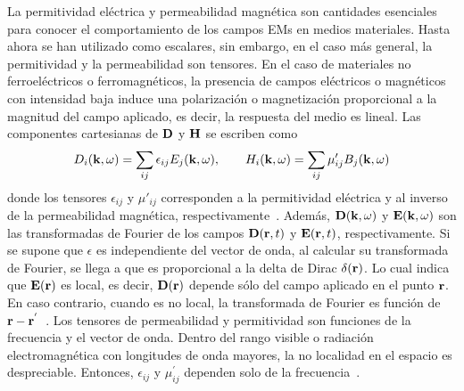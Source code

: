 La permitividad eléctrica y permeabilidad magnética son cantidades esenciales para conocer el comportamiento de los campos EMs en medios materiales. Hasta ahora se han utilizado como escalares, sin embargo, en el caso más general, la permitividad y la permeabilidad son tensores. En el caso de materiales no ferroeléctricos o ferromagnéticos, la presencia de campos eléctricos o magnéticos con intensidad baja induce una polarización o magnetización proporcional a la magnitud del campo aplicado, es decir, la respuesta del medio es lineal. Las componentes cartesianas de $\vb{D}$ y $\vb{H}$ se escriben como~\cite{jackson1999electrodyanmics}
\begin{eqnarray}
D_{i}(\vb{k},\omega)=\sum_{ij}\epsilon_{ij}E_{j}(\vb{k},\omega), \qquad H_{i}(\vb{k},\omega)=\sum_{ij}\mu'_{ij}B_{j}(\vb{k},\omega)\label{eq:def_e_m}
\end{eqnarray}
donde los tensores $\epsilon_{ij}$ y $\mu'_{ij}$ corresponden a la permitividad eléctrica y al inverso de la permeabilidad magnética, respectivamente~\cite{jackson1999electrodynamics}. Además, $\vb{D}(\vb{k},\omega)$ y $\vb{E}(\vb{k},\omega)$ son las transformadas de Fourier de los campos $\vb{D}(\vb{r},t)$ y $\vb{E}(\vb{r},t)$, respectivamente. Si se supone que $\epsilon$ es independiente del vector de onda, al calcular su transformada de Fourier, se llega a que es proporcional a la delta de Dirac $\delta(\vb{r})$. Lo cual indica que $\vb{E}(\vb{r})$ es local, es decir, $\vb{D}(\vb{r})$ depende sólo del campo aplicado en el punto $\vb{r}$. En caso contrario, cuando es no local, la transformada de Fourier es función de $\vb{r}-\vb{r}^{'}$~\cite{yu2010fundamentals}. Los tensores de permeabilidad y permitividad son funciones de la frecuencia y el vector de onda. Dentro del rango visible o radiación electromagnética con longitudes de onda mayores, la no localidad en el espacio es despreciable. Entonces, $\epsilon_{ij}$ y $\mu^{'}_{ij}$ dependen solo de la frecuencia~\cite{jackson1999electrodynamics}.\\


